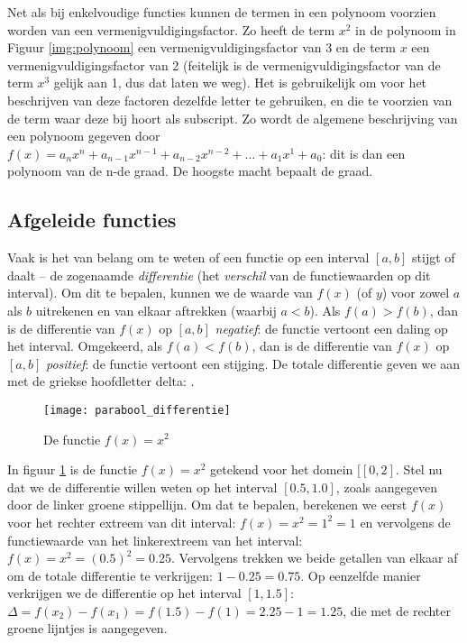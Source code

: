 Net als bij enkelvoudige functies kunnen de termen in een polynoom voorzien worden van een vermenigvuldigingsfactor. Zo heeft de term $x^2$ in de polynoom in Figuur \ref{img:polynoom} een vermenigvuldigingsfactor van 3 en de term $x$ een vermenigvuldigingsfactor van 2 (feitelijk is de vermenigvuldigingsfactor van de term $x^3$ gelijk aan 1, dus dat laten we weg). Het is gebruikelijk om voor het beschrijven van deze factoren dezelfde letter te gebruiken, en die te voorzien van de term waar deze bij hoort als subscript. Zo wordt de algemene beschrijving van een polynoom gegeven door $f(x) = a_nx^n + a_{n-1}x^{n-1} + a_{n-2}x^{n-2}+ \dots + a_1x^1+a_0$: dit is dan een polynoom van de n-de graad. De hoogste macht bepaalt de graad.


\subsection{Afgeleide functies}

Vaak is het van belang om te weten of een functie op een interval $\left[a,b\right]$ stijgt of daalt – de zogenaamde \textit{differentie} (het \textit{verschil} van de functiewaarden op dit interval). Om dit te bepalen, kunnen we de waarde van $f(x)$ (of $y$) voor zowel $a$ als $b$ uitrekenen en van elkaar aftrekken (waarbij $a<b$). Als $f(a) > f(b)$, dan is de differentie van $f(x)$ op $\left[a,b\right]$ \textit{negatief}: de functie vertoont een daling op het interval. Omgekeerd, als $f(a) < f(b)$, dan is de differentie van $f(x)$ op $\left[a,b\right]$ \textit{positief}: de functie vertoont een stijging. De totale differentie geven we aan met de griekse hoofdletter delta: \Delta.

\begin{figure}[h]
    \centering
    \texttt{[image: parabool\_differentie]}
    \caption{De functie $f(x) = x^2$\label{img:parabool_differentie}}
\end{figure}

In figuur \ref{img:parabool_differentie} is de functie $f(x)=x^2$ getekend voor het domein $[\left[0,2\right]$. Stel nu dat we de differentie willen weten op het interval $\left[0.5, 1.0\right]$, zoals aangegeven door de linker groene stippellijn. Om dat te bepalen, berekenen we eerst $f(x)$ voor het rechter extreem van dit interval: $f(x) = x^2 = 1^2 = 1$ en vervolgens de functiewaarde van het linkerextreem van het interval: $f(x) = x^2 = (0.5)^2 = 0.25$. Vervolgens trekken we beide getallen van elkaar af om de totale differentie te verkrijgen: $1-0.25=0.75$. Op eenzelfde manier verkrijgen we de differentie op het interval $\left[1, 1.5\right]$: $\Delta = f(x_2) - f(x_1) = f(1.5)-f(1) = 2.25-1 = 1.25$, die met de rechter groene lijntjes is aangegeven. 


